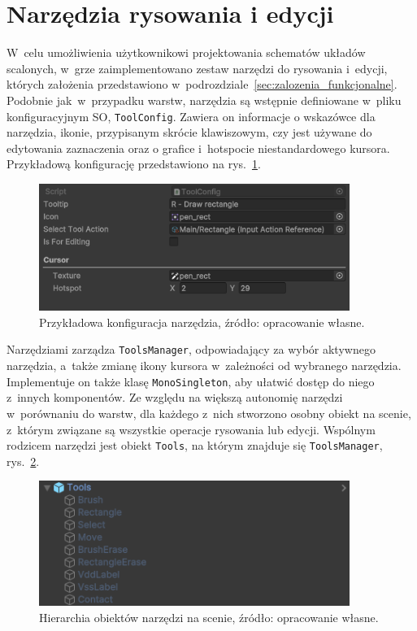 \section{Narzędzia rysowania i edycji}
\label{sec:narzedzia_rysowania_i_edycji}

W~celu umożliwienia użytkownikowi projektowania schematów układów scalo\-nych,
w~grze zaimplementowano zestaw narzędzi do rysowania i~edycji, których założenia przedstawiono w~podrozdziale~\ref{sec:zalozenia_funkcjonalne}.
Podobnie jak~w~przypadku warstw, narzędzia są wstępnie definiowane w~pliku konfiguracyjnym SO, \texttt{ToolConfig}.
Zawiera on informacje o wskazówce dla narzędzia, ikonie, przypisanym skrócie klawiszowym, czy jest używane do edytowania zaznaczenia
oraz o grafice i~hotspocie niestandardowego kursora.
Przykładową konfigurację przedstawiono na rys.~\ref{fig:tool_config}.

\begin{figure}[h!]
    \centering
    \includegraphics[width=0.9\textwidth]{chapters/chapter4/rys/tool_config}
    \caption[Przykładowa konfiguracja narzędzia.]{Przykładowa konfiguracja narzędzia, źródło: opracowanie własne.}
    \label{fig:tool_config}
\end{figure}

Narzędziami zarządza \texttt{ToolsManager}, odpowiadający za wybór aktywnego narzędzia,
a~także zmianę ikony kursora w~zależności od wybranego narzędzia.
Implementuje on także klasę \texttt{MonoSingleton}, aby ułatwić dostęp do niego z~innych komponentów.
Ze względu na większą autonomię narzędzi w~porównaniu do warstw,
dla każdego z~nich stworzono osobny obiekt na scenie, z~którym związane są wszystkie operacje rysowania lub edycji.
Wspólnym rodzicem narzędzi jest obiekt \texttt{Tools}, na którym znajduje się \texttt{ToolsManager},
rys.~\ref{fig:tools_hierarchy}.

\begin{figure}[h!]
    \centering
    \includegraphics[width=0.9\textwidth]{chapters/chapter4/rys/tools_hierarchy}
    \caption[Hierarchia obiektów narzędzi na scenie.]{Hierarchia obiektów narzędzi na scenie, źródło: opracowanie własne.}
    \label{fig:tools_hierarchy}
\end{figure}

